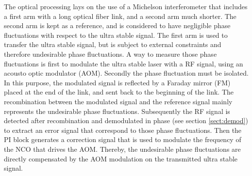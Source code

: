 \documentclass[12pt,oneside]{article}
\begin{document}

\vspace{0.5cm}
The optical processing lays on the use of a Michelson interferometer that includes a first arm with a long optical fiber link, and a second arm much shorter. The second arm is kept as a reference, and is considered to have negligible phase fluctuations with respect to the ultra stable signal. The first arm is used to transfer the ultra stable signal, but is subject to external constraints and therefore undesirable phase fluctuations. A way to measure those phase fluctuations is first to modulate the ultra stable laser with a RF signal, using an acousto optic modulator (AOM). Secondly the phase fluctuation must be isolated. In this purpose, the modulated signal is reflected by a Faraday mirror (FM) placed at the end of the link, and sent back to the beginning of the link. The recombination between the modulated signal and the reference signal mainly represents the undesirable phase fluctuations. 
\newline\newline
Subsequently the RF signal is detected after recombination and demodulated in phase (see section \ref{sect:demod}) to extract an error signal that correspond to those phase fluctuations. Then the PI block generates a correction signal that is used to modulate the frequency of the NCO that drives the AOM. Thereby, the undesirable phase fluctuations are directly compensated by the AOM modulation on the transmitted ultra stable signal. 
\end{document}
